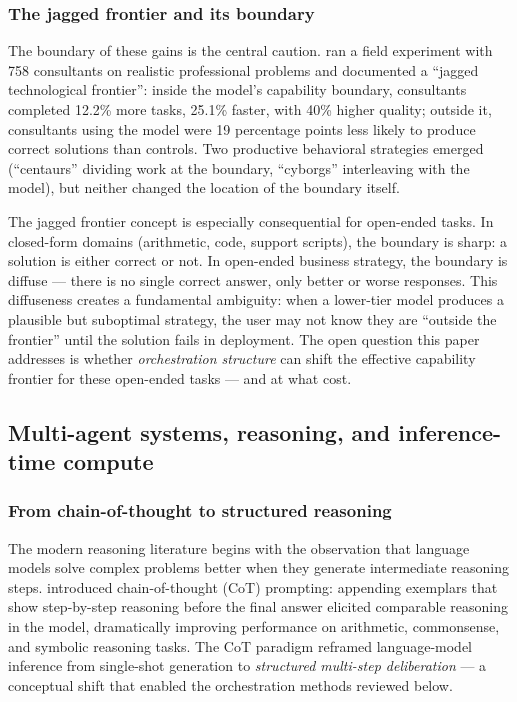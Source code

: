 \documentclass[12pt,a4paper]{article}
\begin{document}
\subsubsection{The jagged frontier and its boundary}

The boundary of these gains is the central caution. \citet{DellAcquaEtAl2023}
ran a field experiment with 758 consultants on realistic professional problems
and documented a ``jagged technological frontier'': inside the model's
capability boundary, consultants completed 12.2\% more tasks, 25.1\% faster,
with 40\% higher quality; outside it, consultants using the model were 19
percentage points less likely to produce correct solutions than controls. Two
productive behavioral strategies emerged (``centaurs'' dividing work at the
boundary, ``cyborgs'' interleaving with the model), but neither changed the
location of the boundary itself.

The jagged frontier concept is especially consequential for open-ended tasks.
In closed-form domains (arithmetic, code, support scripts), the boundary is
sharp: a solution is either correct or not. In open-ended business strategy,
the boundary is diffuse --- there is no single correct answer, only better or
worse responses. This diffuseness creates a fundamental ambiguity: when a lower-tier
model produces a plausible but suboptimal strategy, the user may not know they
are ``outside the frontier'' until the solution fails in deployment. The open
question this paper addresses is whether \emph{orchestration structure} can
shift the effective capability frontier for these open-ended tasks --- and at
what cost.

\subsection{Multi-agent systems, reasoning, and inference-time compute}

\subsubsection{From chain-of-thought to structured reasoning}

The modern reasoning literature begins with the observation that language models
solve complex problems better when they generate intermediate reasoning steps.
\citet{WeiEtAl2022} introduced chain-of-thought (CoT) prompting: appending
exemplars that show step-by-step reasoning before the final answer elicited
comparable reasoning in the model, dramatically improving performance on
arithmetic, commonsense, and symbolic reasoning tasks. The CoT paradigm
reframed language-model inference from single-shot generation to
\emph{structured multi-step deliberation} --- a conceptual shift that enabled
the orchestration methods reviewed below.
\end{document}

